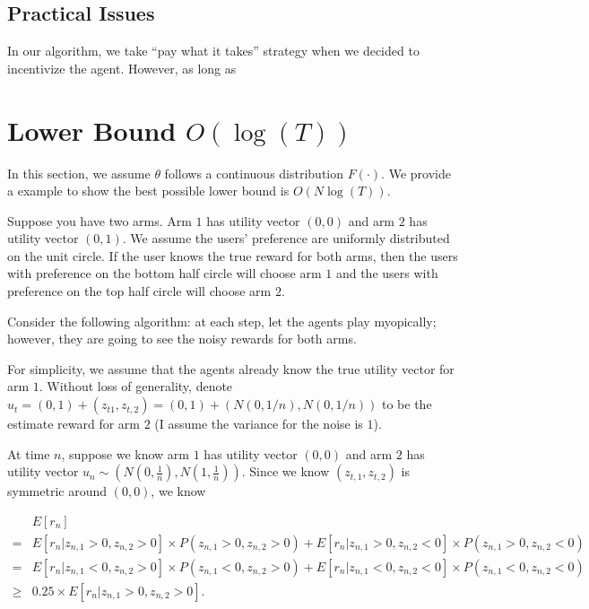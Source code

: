 \documentclass{article}
\begin{document}
\subsection{Practical Issues}

In our algorithm, we take ``pay what it takes'' strategy when we decided to incentivize the agent. However, as long as 

\section{Lower Bound $O(\log(T))$}
\label{sec:lb}

In this section, we assume $\theta$ follows a continuous distribution $F(\cdot)$. We provide a example to show the best possible lower bound is $O(N\log(T))$.

Suppose you have two arms. Arm $1$ has utility vector $(0,0)$ and arm $2$ has utility vector $(0,1)$. We assume the users' preference are uniformly distributed on the unit circle. If the user knows the true reward for both arms, then the users with preference on the bottom half circle will choose arm $1$ and the users with preference on the top half circle will choose arm $2$.


Consider the following algorithm: at each step, let the agents play myopically; however, they are going to see the noisy rewards for both arms.

For simplicity, we assume that the agents already know the true utility vector for arm $1$. Without loss of generality, denote $u_{t} = (0,1)+(z_{t1},z_{t,2}) = (0,1)+ (N(0,1/n),N(0,1/n))$ to be the estimate reward for arm $2$ (I assume the variance for the noise is $1$). 


At time $n$, suppose we know arm $1$ has utility vector $(0,0)$ and arm $2$ has utility vector $u_n\sim (N(0,\frac{1}{n}), N(1,\frac{1}{n}))$. Since we know $(z_{t,1}, z_{t,2})$ is symmetric around $(0,0)$, we know 

\begin{align}
&E[r_n] \nonumber \\
= &E[r_n | z_{n,1}>0,z_{n,2}>0] \times P(z_{n,1}>0,z_{n,2}>0) + E[r_n |z_{n,1}>0,z_{n,2}<0] \times P(z_{n,1}>0,z_{n,2}<0) \nonumber \\
= &E[r_n | z_{n,1}<0,z_{n,2}>0] \times P(z_{n,1}<0,z_{n,2}>0) + E[r_n |z_{n,1}<0,z_{n,2}<0] \times P(z_{n,1}<0,z_{n,2}<0) \nonumber \\
\geq & 0.25 \times E[r_n | z_{n,1}>0, z_{n,2}>0]. \nonumber
\end{align}
\end{document}
